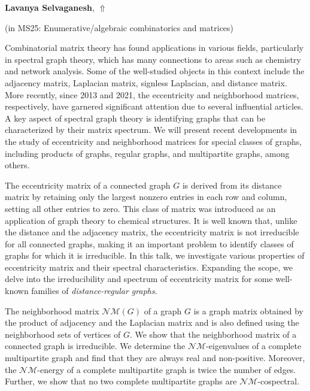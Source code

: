 \documentclass[ILAS2025-program.tex]{subfiles}
\begin{document}
\hypertarget{down0226}{}\begin{ilasabstract}
    
\textbf{Lavanya Selvaganesh},  \hfill \hyperlink{up0226}{$\Uparrow$}
    
    
(in {\color{mstitle}MS25: Enumerative/algebraic combinatorics and matrices})
        
\mtskip
    Combinatorial matrix theory has found applications in various fields, particularly in spectral graph theory, which has many connections to areas such as chemistry and network analysis. Some of the well-studied objects in this context include the adjacency matrix, Laplacian matrix, signless Laplacian, and distance matrix. More recently, since 2013 and 2021, the eccentricity and neighborhood matrices, respectively, have garnered significant attention due  to several influential articles. A key aspect of spectral graph theory is identifying graphs that can be characterized by their matrix spectrum. We will present recent developments in the study of eccentricity and neighborhood matrices for special classes of graphs, including products of graphs, regular graphs, and multipartite graphs, among others. 

The eccentricity matrix of a connected graph $G$ is derived from its distance matrix by retaining only the largest nonzero entries in each row and column, setting all other entries to zero. This class of matrix was introduced as an application of graph theory to chemical structures.  It is well known that, unlike the distance and the adjacency matrix, the eccentricity matrix is not irreducible for all connected graphs, making it an important problem to identify classes of graphs for which it is irreducible. In this talk, we  investigate various properties of eccentricity matrix and their spectral characteristics. Expanding the scope, we delve into the irreducibility and spectrum of eccentricity matrix for some well-known families of \textit{distance-regular graphs}. 

The neighborhood matrix $\mathcal{NM}(G)$ of a graph $G$ is a graph matrix obtained by the product of adjacency and the Laplacian matrix and is also defined using the neighborhood sets of vertices of $G$. We show that the neighborhood matrix of a connected graph is irreducible.  We determine the $\mathcal{NM}$-eigenvalues of a complete multipartite graph and find that they are always real and non-positive. Moreover, the $\mathcal{NM}$-energy of a complete multipartite graph is twice the number of edges. Further, we show that no two complete multipartite graphs are $\mathcal{NM}$-cospectral.

\end{ilasabstract}
    
\end{document}
